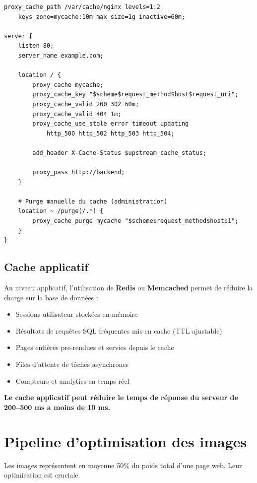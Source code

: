 \documentclass[12pt,a4paper,twoside]{report}
\newcommand{\keyword}[1]{\textbf{\textcolor{googleblue}{#1}}}
\newcommand{\important}[1]{\textbf{\textcolor{googlered}{#1}}}
\begin{document}
\begin{lstlisting}[style=code,caption={Configuration NGINX pour le cache serveur FastCGI}]
proxy_cache_path /var/cache/nginx levels=1:2
    keys_zone=mycache:10m max_size=1g inactive=60m;

server {
    listen 80;
    server_name example.com;

    location / {
        proxy_cache mycache;
        proxy_cache_key "$scheme$request_method$host$request_uri";
        proxy_cache_valid 200 302 60m;
        proxy_cache_valid 404 1m;
        proxy_cache_use_stale error timeout updating
            http_500 http_502 http_503 http_504;

        add_header X-Cache-Status $upstream_cache_status;

        proxy_pass http://backend;
    }

    # Purge manuelle du cache (administration)
    location ~ /purge(/.*) {
        proxy_cache_purge mycache "$scheme$request_method$host$1";
    }
}
\end{lstlisting}

\subsection{Cache applicatif}

Au niveau applicatif, l'utilisation de \keyword{Redis} ou \keyword{Memcached} permet de réduire la charge sur la base de données :

\begin{itemize}
    \item Sessions utilisateur stockées en mémoire
    \item Résultats de requêtes SQL fréquentes mis en cache (TTL ajustable)
    \item Pages entières pre-rendues et servies depuis le cache
    \item Files d'attente de tâches asynchrones
    \item Compteurs et analytics en temps réel
\end{itemize}

\important{Le cache applicatif peut réduire le temps de réponse du serveur de 200--500 ms a moins de 10 ms.}

\section{Pipeline d'optimisation des images}

Les images représentent en moyenne 50\% du poids total d'une page web. Leur optimisation est cruciale.
\end{document}
